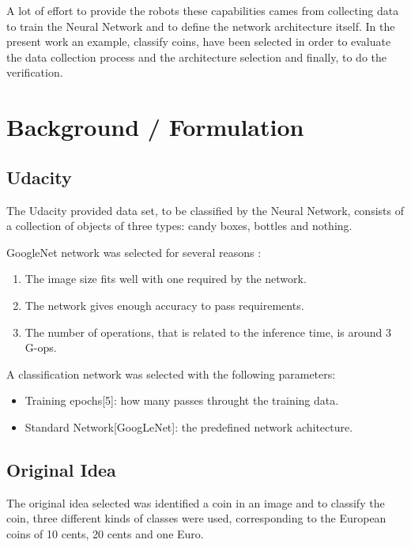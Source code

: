 \documentclass[10pt,journal,compsoc]{IEEEtran}
\begin{document}
A lot of effort to provide the robots these capabilities cames from collecting data to train the Neural Network and to define the network architecture itself. In the present work an example, classify coins, have been selected in order to evaluate the data collection process and the architecture selection and finally, to do the verification.
	
\section{Background / Formulation}

\subsection{Udacity}

The Udacity provided data set, to be classified by the Neural Network, consists of a collection of objects of three types: candy boxes, bottles and nothing.

GoogleNet network was selected for several reasons \cite{analysisdnn}:

\begin{enumerate}
\item The image size fits well with one required by the network.
\item The network gives enough accuracy to pass requirements.
\item The number of operations, that is related to the inference time, is around 3 G-ops.
\end{enumerate}


A classification network was selected with the following parameters:

\begin{itemize}
	\item Training epochs[5]: how many passes throught the training data.
	\item Standard Network[GoogLeNet]: the predefined network achitecture.
\end{itemize}


\subsection{Original Idea}

The original idea selected was identified a coin in an image and to classify the coin, three different kinds of classes were used, corresponding to the European coins of 10 cents, 20 cents and one Euro.
\end{document}
